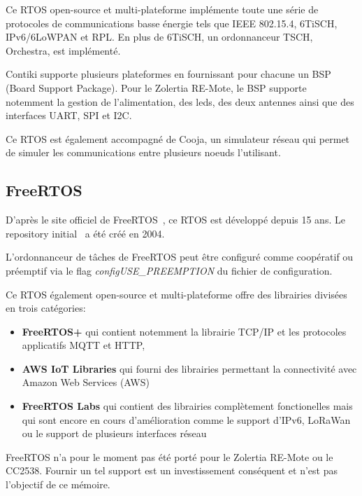     Ce RTOS open-source et multi-plateforme implémente toute une série de protocoles de communications basse énergie tels que IEEE 802.15.4, 6TiSCH, IPv6/6LoWPAN et RPL. En plus de 6TiSCH, un ordonnanceur TSCH, Orchestra, est implémenté.
    

    Contiki supporte plusieurs plateformes en fournissant pour chacune un BSP (Board Support Package). Pour le Zolertia RE-Mote, le BSP supporte notemment la gestion de l'alimentation, des leds, des deux antennes ainsi que des interfaces UART, SPI et I2C.

    Ce RTOS est également accompagné de Cooja, un simulateur réseau qui permet de simuler les communications entre plusieurs noeuds l'utilisant.

\subsection*{FreeRTOS}
    D'après le site officiel de FreeRTOS~\cite{freertos}, ce RTOS est développé depuis 15 ans.
    Le repository initial~\cite{freertos:repo} a été créé en 2004.

    L'ordonnanceur de tâches de FreeRTOS peut être configuré comme coopératif ou préemptif via le flag \textit{configUSE\_PREEMPTION} du fichier de configuration.

    Ce RTOS également open-source et multi-plateforme offre des librairies divisées en trois catégories:
    \begin{itemize}

        \item \textbf{FreeRTOS+} qui contient notemment la librairie TCP/IP et les protocoles applicatifs MQTT et HTTP,
        \item \textbf{AWS IoT Libraries} qui fourni des librairies permettant la connectivité avec Amazon Web Services (AWS)
        \item \textbf{FreeRTOS Labs} qui contient des librairies complètement fonctionelles mais qui sont encore en cours d'amélioration comme le support d'IPv6, LoRaWan ou le support de plusieurs interfaces réseau
    \end{itemize}
    \vspace{0.5cm}
    FreeRTOS n'a pour le moment pas été porté pour le Zolertia RE-Mote ou le CC2538. Fournir un tel support est un investissement conséquent et n'est pas l'objectif de ce mémoire.


